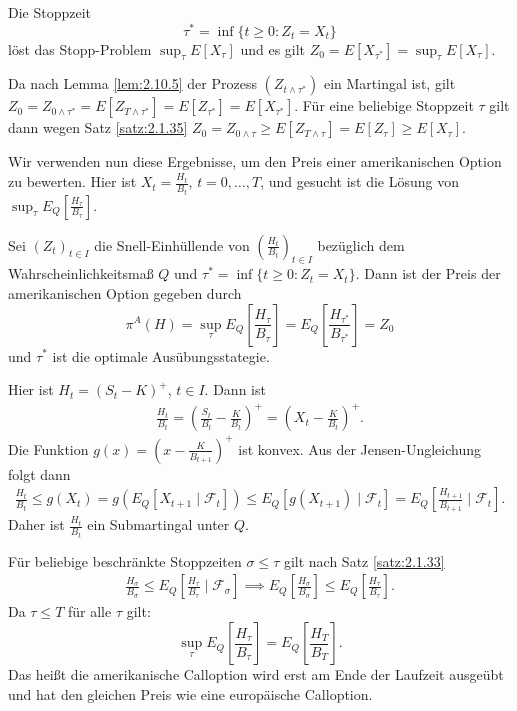 \documentclass[a4paper,twoside,DIV15,BCOR12mm]{scrbook}
\newcommand{\cF}{\mathcal F}
\begin{document}
\begin{satz} Die Stoppzeit
\[
\tau^* = \inf\{t \ge 0: Z_t = X_t\}
\]
löst das Stopp-Problem $\sup_{\tau}E[X_\tau]$ und es gilt $Z_0 = E[X_{\tau^*}] = \sup_\tau E[X_\tau]$.
\end{satz}

\begin{beweis}
Da nach Lemma \ref{lem:2.10.5} der Prozess $(Z_{t\wedge \tau^*})$ ein Martingal ist, gilt $Z_0 = Z_{0\wedge \tau^*} = E[Z_{T\wedge \tau^*}] = E[Z_{\tau^*}]=E[X_{\tau^*}]$. Für eine beliebige Stoppzeit $\tau$ gilt dann wegen Satz \ref{satz:2.1.35}
$Z_0 = Z_{0\wedge \tau} \ge E[Z_{T \wedge\tau}] = E[Z_\tau] \ge E[X_\tau]$.
\end{beweis}

Wir verwenden nun diese Ergebnisse, um den Preis einer amerikanischen Option zu bewerten. Hier ist $X_t = \frac{H_t}{B_t}$, $t=0,\ldots,T$, und gesucht ist die Lösung von $\sup_\tau E_Q[\frac{H_\tau}{B_\tau}]$.

\begin{korollar}
Sei $(Z_t)_{t\in I}$ die Snell-Einhüllende von $(\frac{H_t}{B_t})_{t\in I}$ bezüglich dem Wahrscheinlichkeitsmaß $Q$ und $\tau^* = \inf\{t\ge 0: Z_t= X_t\}$. Dann ist der Preis der amerikanischen Option gegeben durch
\[
\pi^A(H) = \sup_{\tau}E_Q\left[\frac{H_\tau}{B_\tau}\right] = E_Q\left[\frac{H_{\tau^*}}{B_{\tau^*}}\right] = Z_0
\]
und $\tau^*$ ist die optimale Ausübungsstategie.
\end{korollar}

\begin{beispiel}
Hier ist $H_t = (S_t - K)^+$, $t\in I$. Dann ist 
\begin{align*}
\frac{H_t}{B_t} = \left(\frac{S_t}{B_t} - \frac{K}{B_t}\right)^+ = \left( X_t - \frac{K}{B_t}\right)^+.
\end{align*}
Die Funktion $g(x) = \left(x - \frac{K}{B_{t+1}}\right)^+$ ist konvex. Aus der Jensen-Ungleichung folgt dann
\begin{align*}
\frac{H_t}{B_t} \le g(X_t) = g(E_Q[X_{t+1}\mid \cF_t]) \le E_Q[g(X_{t+1}) \mid \cF_t] = E_Q[\frac{H_{t+1}}{B_{t+1}}\mid \cF_t].
\end{align*}
Daher ist $\frac{H_t}{B_t}$ ein Submartingal unter $Q$.

Für beliebige beschränkte Stoppzeiten $\sigma\le\tau$ gilt nach Satz \ref{satz:2.1.33}
\begin{align*}
\frac{H_\sigma}{B_\sigma} \le E_Q\left[\frac{H_\tau}{B_\tau}\mid \cF_\sigma\right] 
\implies E_Q\left[\frac{H_\sigma}{B_\sigma}\right] \le E_Q\left[\frac{H_\tau}{B_{\tau}}\right].
\end{align*}
Da $\tau\le T$ für alle $\tau$ gilt:
\[
\sup_{\tau} E_Q\left[\frac{H_\tau}{B_\tau}\right] = E_Q\left[\frac{H_T}{B_T}\right].
\]
Das heißt die amerikanische Calloption wird erst am Ende der Laufzeit ausgeübt und hat den gleichen Preis wie eine europäische Calloption.
\end{beispiel}
\end{document}
